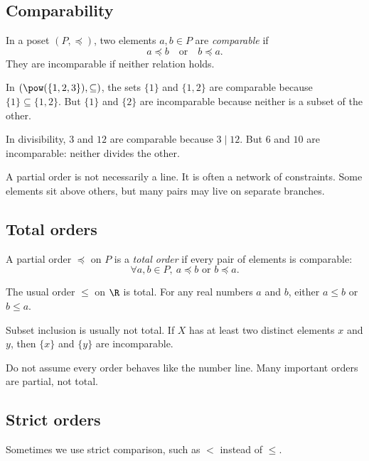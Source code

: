 \subsection{Comparability}

In a poset $(P,\preceq)$, two elements $a,b\in P$ are \emph{comparable} if
\[
a\preceq b\quad\text{or}\quad b\preceq a.
\]
They are incomparable if neither relation holds.

In $(\pow(\{1,2,3\}),\subseteq)$, the sets $\{1\}$ and $\{1,2\}$ are comparable because $\{1\}\subseteq\{1,2\}$. But $\{1\}$ and $\{2\}$ are incomparable because neither is a subset of the other.

In divisibility, $3$ and $12$ are comparable because $3\mid12$. But $6$ and $10$ are incomparable: neither divides the other.

\begin{intuitionbox}
A partial order is not necessarily a line. It is often a network of constraints. Some elements sit above others, but many pairs may live on separate branches.
\end{intuitionbox}

\subsection{Total orders}

\begin{definition}
A partial order $\preceq$ on $P$ is a \emph{total order} if every pair of elements is comparable:
\[
\forall a,b\in P,\ a\preceq b\text{ or }b\preceq a.
\]
\end{definition}

The usual order $\leq$ on $\R$ is total. For any real numbers $a$ and $b$, either $a\leq b$ or $b\leq a$.

Subset inclusion is usually not total. If $X$ has at least two distinct elements $x$ and $y$, then $\{x\}$ and $\{y\}$ are incomparable.

\begin{trapbox}
Do not assume every order behaves like the number line. Many important orders are partial, not total.
\end{trapbox}

\subsection{Strict orders}

Sometimes we use strict comparison, such as $<$ instead of $\leq$.

